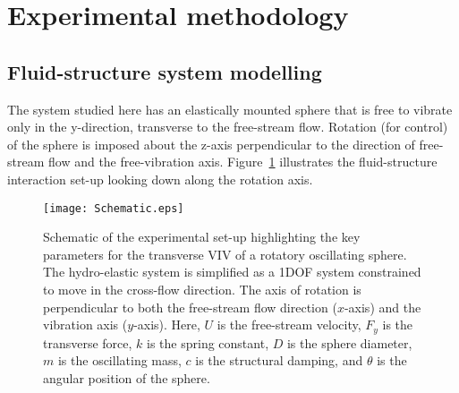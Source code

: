 \documentclass[3p]{elsarticle}
\begin{document}


\section{Experimental methodology}
\subsection{Fluid-structure system modelling}%
The system studied here has an elastically mounted sphere that
is free to vibrate only in the y-direction, transverse to the free-stream
flow. Rotation (for control) of the sphere is imposed about the z-axis
perpendicular to the direction of free-stream flow and the
free-vibration axis. Figure~\ref{fig:Schematic} illustrates the
fluid-structure interaction set-up looking down along the rotation
axis.
%
\begin{figure}
	\centering
	\texttt{[image: Schematic.eps]}
	\caption{Schematic of the experimental set-up highlighting the
		key parameters for the transverse VIV of a rotatory
		oscillating sphere. The hydro-elastic system is simplified
		as a 1DOF system constrained to move in the cross-flow
		direction. The axis of rotation is perpendicular to both the
		free-stream flow direction ($x$-axis) and the vibration axis
		($y$-axis). Here, $U$ is the free-stream velocity, $F_y$ is
		the transverse force, $k$ is the spring constant, $D$ is the
		sphere diameter, $m$ is the oscillating mass, $c$ is the
		structural damping, and $\theta$ is the angular position of
		the sphere.}
	\label{fig:Schematic}
\end{figure}
\end{document}
